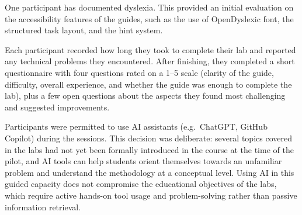 One participant has documented dyslexia. This provided an initial evaluation on the accessibility features of the guides, such as the use
of OpenDyslexic font, the structured task layout, and the hint system.

Each participant recorded how long they took to complete their lab and
reported any technical problems they encountered. After finishing, they
completed a short questionnaire with four questions rated on a 1--5 scale
(clarity of the guide, difficulty, overall experience, and whether the guide
was enough to complete the lab), plus a few open questions about the aspects they found most challenging and suggested improvements.

Participants were permitted to use AI assistants (e.g.\, ChatGPT, GitHub Copilot)
during the sessions. This decision was deliberate: several topics covered in the labs
had not yet been formally introduced in the course at the time of the pilot, and AI
tools can help students orient themselves towards an unfamiliar problem and understand
the methodology at a conceptual level. Using AI in this guided capacity does not
compromise the educational objectives of the labs, which require active hands-on
tool usage and problem-solving rather than passive information retrieval.
